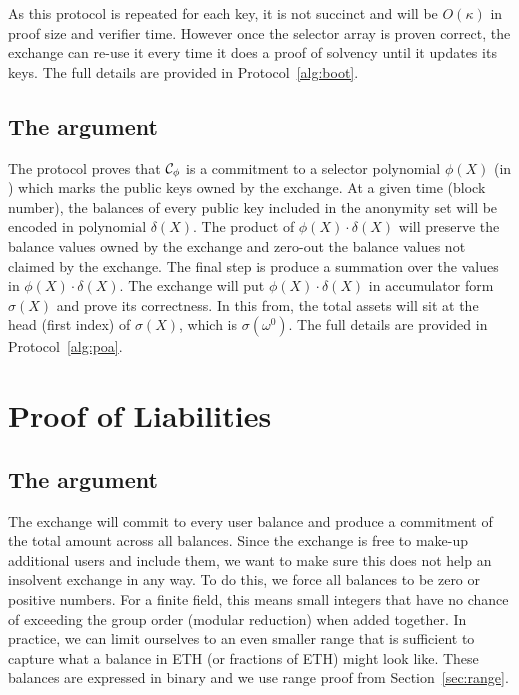 As this protocol is repeated for each key, it is not succinct and will be $O(\kappa)$ in proof size and verifier time. However once the selector array is proven correct, the exchange can re-use it every time it does a proof of solvency until it updates its keys. The full details are provided in Protocol~\ref{alg:boot}.


\subsection{The \poa argument}


The \bootstrap protocol proves that $\mathcal{C}_\phi$ is a commitment to a selector polynomial $\phi(X)$ (in \bls) which marks the public keys owned by the exchange. At a given time (block number), the balances of every public key included in the anonymity set will be encoded in polynomial $\delta(X)$. The product of $\phi(X)\cdot\delta(X)$ will preserve the balance values owned by the exchange and zero-out the balance values not claimed by the exchange. The final step is produce a summation over the values in $\phi(X)\cdot\delta(X)$. The exchange will put $\phi(X)\cdot\delta(X)$ in accumulator form $\sigma(X)$ and prove its correctness. In this from, the total assets will sit at the head (first index) of $\sigma(X)$, which is $\sigma(\omega^0)$. The full details are provided in Protocol~\ref{alg:poa}.


\section{Proof of Liabilities}

\subsection{The \pol argument}


The exchange will commit to every user balance and produce a commitment of the total amount across all balances. Since the exchange is free to make-up additional users and include them, we want to make sure this does not help an insolvent exchange in any way. To do this, we force all balances to be zero or positive numbers. For a finite field, this means small integers that have no chance of exceeding the group order (modular reduction) when added together. In practice, we can limit ourselves to an even smaller range that is sufficient to capture what a balance in ETH (or fractions of ETH) might look like. These balances are expressed in binary and we use range proof from Section~\ref{sec:range}.

